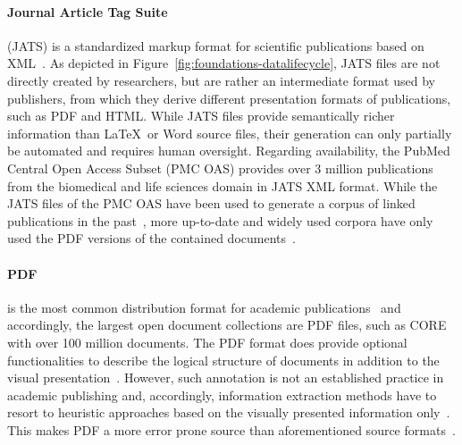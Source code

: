 \paragraph{Journal Article Tag Suite}
(JATS) is a standardized markup format for scientific publications based on XML~\cite{Huh2014}. As depicted in Figure~\ref{fig:foundations-datalifecycle}, JATS files are not directly created by researchers, but are rather an intermediate format used by publishers, from which they derive different presentation formats of publications, such as PDF and HTML. While JATS files provide semantically richer information than \LaTeX\ or Word source files, their generation can only partially be automated and requires human oversight. Regarding availability, the PubMed Central Open Access Subset (PMC OAS) provides over 3 million publications from the biomedical and life sciences domain in JATS XML format. While the JATS files of the PMC OAS have been used to generate a corpus of linked publications in the past~\cite{Gipp2015}, more up-to-date and widely used corpora have only used the PDF versions of the contained documents~\cite{Lo2020}.

\paragraph{PDF}
is the most common distribution format for academic publications~\cite{Johnson2018stm} and accordingly, the largest open document collections are PDF files, such as CORE~\cite{core} with over 100 million documents. The PDF format does provide optional functionalities to describe the logical structure of documents in addition to the visual presentation~\cite{ISO32000-2}. However, such annotation is not an established practice in academic publishing and, accordingly, information extraction methods have to resort to heuristic approaches based on the visually presented information only~\cite{Lopez2009,Nasar2018,Faerber202x}. This makes PDF a more error prone source than aforementioned source formats~\cite{Bast2017}.


